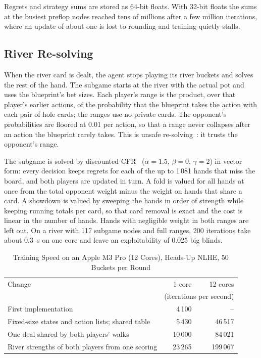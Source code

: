 \documentclass{ieeeaccess}
\begin{document}
Regrets and strategy sums are stored as 64-bit floats. With 32-bit floats the sums at the busiest
preflop nodes reached tens of millions after a few million iterations, where an update of about
one is lost to rounding and training quietly stalls.

\subsection{River Re-solving}
When the river card is dealt, the agent stops playing its river buckets and solves the rest of
the hand. The subgame starts at the river with the actual pot and uses the blueprint's bet
sizes. Each player's range is the product, over that player's earlier actions, of the
probability that the blueprint takes the action with each pair of hole cards; the ranges use no
private cards. The opponent's probabilities are floored at 0.01 per action, so that a range
never collapses after an action the blueprint rarely takes. This is unsafe
re-solving~\cite{brown2018}: it trusts the opponent's range.

The subgame is solved by discounted CFR~\cite{brown2019dcfr} ($\alpha=1.5$, $\beta=0$,
$\gamma=2$) in vector form: every decision keeps regrets for each of the up to 1\,081 hands
that miss the board, and both players are updated in turn. A fold is valued for all hands at
once from the total opponent weight minus the weight on hands that share a card. A showdown is
valued by sweeping the hands in order of strength while keeping running totals per card, so
that card removal is exact and the cost is linear in the number of hands. Hands with negligible
weight in both ranges are left out. On a river with 117 subgame nodes and full ranges, 200
iterations take about 0.3~s on one core and leave an exploitability of 0.025 big blinds.

\begin{table}[t]
\caption{Training Speed on an Apple M3 Pro (12 Cores), Heads-Up NLHE, 50 Buckets per Round}
\label{tab:speed}
\centering
\begin{tabular}{lrr}
\hline
Change & 1 core & 12 cores \\
 & \multicolumn{2}{c}{(iterations per second)} \\
\hline
First implementation & 4\,100 & -- \\
Fixed-size states and action lists; shared table & 5\,430 & 46\,517 \\
One deal shared by both players' walks & 10\,000 & 84\,021 \\
River strengths of both players from one scoring & 23\,265 & 199\,067 \\
\hline
\end{tabular}
\end{table}
\end{document}
